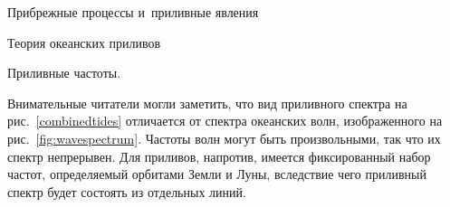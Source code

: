 \begin{chapter}{Прибрежные процессы и~приливные явления}
\begin{section}{Теория океанских приливов}
\begin{paragraph}{Приливные частоты.}

Внимательные читатели могли заметить, что вид приливного спектра на 
рис.~\ref{combinedtides} отличается от спектра океанских волн,
изображенного на рис.~\ref{fig:wavespectrum}. Частоты волн могут быть
произвольными, так что их спектр непрерывен. Для приливов, напротив, 
имеется фиксированный набор частот, определяемый орбитами Земли и 
Луны, вследствие чего приливный спектр будет состоять 
из отдельных линий.
%


\end{paragraph}
\end{section}
\end{chapter}
